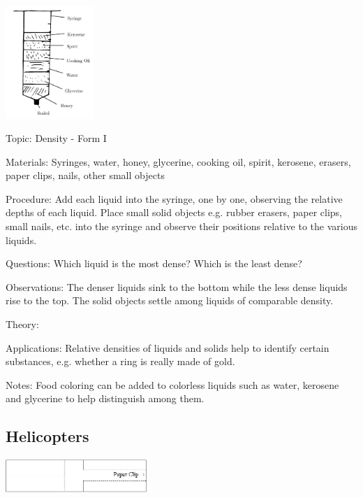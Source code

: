 \begin{multicols}{2}
\begin{center}
\includegraphics[width=0.25\textwidth]{./img/density-tower.png}
\end{center}

\begin{description*}
\item[Topic:]{Density - Form I}
\item[Materials:]{Syringes, water, honey, glycerine, cooking oil, spirit, kerosene, erasers, paper clips, nails, other small objects}
\item[Procedure:]{Add each liquid into the syringe, one by one, observing the relative depths of each liquid. Place small solid objects e.g. rubber erasers, paper clips, small nails, etc. into the syringe and observe their positions relative to the various liquids.}
\item[Questions:]{Which liquid is the most dense? Which is the least dense?}
\item[Observations:]{The denser liquids sink to the bottom while the less dense liquids rise to the top. The solid objects settle among liquids of comparable density.}
\item[Theory:]{}
\item[Applications:]{Relative densities of liquids and solids help to identify certain substances, e.g. whether a ring is really made of gold.}
\item[Notes:]{Food coloring can be added to colorless liquids such as water, kerosene and glycerine to help distinguish among them.}
\end{description*}

\subsection{Helicopters}

\begin{center}
\includegraphics[width=0.4\textwidth]{./img/helicopter-1.png}
\end{center}


\end{multicols}
